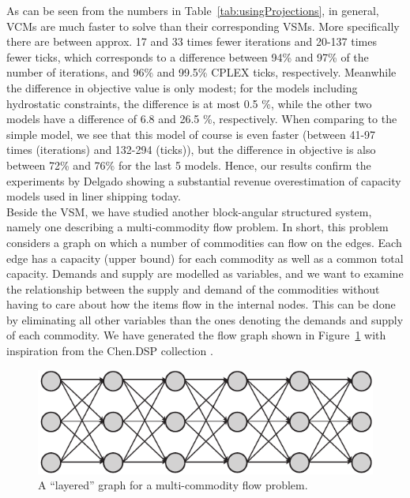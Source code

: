 \documentclass{llncs}
\begin{document}
As can be seen from the numbers in Table~\ref{tab:usingProjections}, in general, VCMs are much faster to solve than their corresponding VSMs. More specifically there are between approx. 17 and 33 times fewer iterations and 20-137 times fewer ticks, which corresponds to a difference between 94\% and 97\% of the number of iterations, and 96\% and 99.5\% CPLEX ticks, respectively. Meanwhile the difference in objective value is only modest; for the models including hydrostatic constraints, the difference is at most 0.5 \%, while the other two models have a difference of 6.8 and 26.5 \%, respectively. 
When comparing to the simple model, we see that this model of course is even faster (between 41-97 times (iterations) and 132-294 (ticks)), but the difference in objective is also between 72\% and 76\% for the last 5 models. Hence, our results confirm the experiments by Delgado \cite{AlbertosThesis} showing a substantial revenue overestimation of capacity models used in liner shipping today. \\
\indent Beside the VSM, we have studied another block-angular structured system, namely one describing a multi-commodity flow problem.  
In short, this problem considers a graph on which a number of commodities can flow on the edges. Each edge has a capacity (upper bound) for each commodity as well as a common total capacity. Demands and supply are modelled as variables, and we want to examine the relationship between the supply and demand of the commodities without having to care about how the items flow in the internal nodes. This can be done by eliminating all other variables than the ones denoting the demands and supply of each commodity. We have generated the flow graph shown in Figure~\ref{fig:multiflow} with inspiration from the Chen.DSP collection \cite{JLFP93}. 
\begin{figure}[b!]
	\centering
		\includegraphics[scale=0.5]{figures/multiflow2.pdf}
	\caption{A ``layered''  graph for a multi-commodity flow problem.}
	\label{fig:multiflow}
\end{figure}
\end{document}
